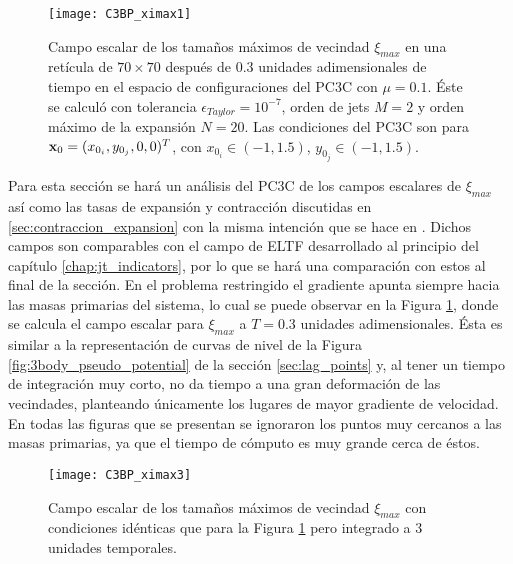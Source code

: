 \begin{figure}
 \centering
 \texttt{[image: C3BP\_ximax1]}
 \caption{Campo escalar de los tamaños máximos de vecindad $\xi_{max}$ en una retícula de $70 \times 70$  después de $0.3$ unidades adimensionales de tiempo en el espacio de configuraciones del PC3C con $\mu = 0.1$. Éste se calculó con tolerancia $\epsilon_{Taylor} = 10^{-7}$, orden de jets $M = 2$ y orden máximo de la expansión $N = 20$. Las condiciones del PC3C son para $\mathbf{x}_0 = (x_{0_i}, y_{0_j}, 0, 0)^T$, con $x_{0_i} \in (-1, 1.5)$, $y_{0_j} \in (-1, 1.5)$.}
 \label{fig:C3BP_ximax1}
\end{figure}


Para esta sección se hará un análisis del PC3C de los campos escalares de $\xi_{max}$ así como las tasas de expansión y contracción discutidas en \ref{sec:contraccion_expansion} con la misma intención que se hace en \cite{Perez2015}. Dichos campos son comparables con el campo de ELTF desarrollado al principio del capítulo \ref{chap:jt_indicators}, por lo que se hará una comparación con estos al final de la sección. En el problema restringido el gradiente apunta siempre hacia las masas primarias del sistema, lo cual se puede observar en la Figura \ref{fig:C3BP_ximax1}, donde se calcula el campo escalar para $\xi_{max}$ a $T = 0.3$ unidades adimensionales. Ésta es similar a la representación de curvas de nivel de la Figura \ref{fig:3body_pseudo_potential} de la sección \ref{sec:lag_points} y, al tener un tiempo de integración muy corto, no da tiempo a una gran deformación de las vecindades, planteando únicamente los lugares de mayor gradiente de velocidad. En todas las figuras que se presentan se ignoraron los puntos muy cercanos a las masas primarias, ya que el tiempo de cómputo es muy grande cerca de éstos. 

\begin{figure}
 \centering
 \texttt{[image: C3BP\_ximax3]}
 \caption{Campo escalar de los tamaños máximos de vecindad $\xi_{max}$ con condiciones idénticas que para la Figura \ref{fig:C3BP_ximax1} pero integrado a $3$ unidades temporales.}

 \label{fig:C3BP_ximax3}
\end{figure}

